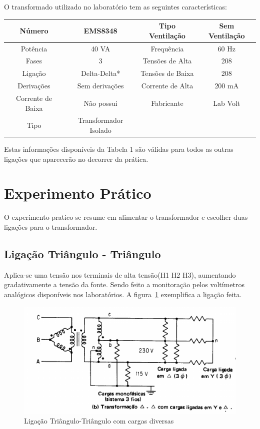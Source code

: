 \documentclass[paper=a4, fontsize=11pt]{article}
\begin{document}
O transformado utilizado no laboratório tem as seguintes características:

\renewcommand{\arraystretch}{1.5}
\begin{center}
    \begin{tabular}{c|c||c|c}
        Número & EMS8348  & Tipo Ventilação & Sem Ventilação\\
        \hline
        Potência & 40 VA & Frequência & 60 Hz\\
        \hline
        Fases  & 3 & Tensões de Alta & 208\\
        \hline
        Ligação & Delta-Delta* & Tensões de Baixa & 208\\
        \hline
        Derivações & Sem derivações & Corrente de Alta & 200 mA \\
        \hline
        Corrente de Baixa & Não possui & Fabricante & Lab Volt\\
        \hline
        Tipo & Transformador Isolado &&\\
    \end{tabular}
\end{center}

Estas informações disponíveis da Tabela 1 são válidas para todos as outras ligações
que aparecerão no decorrer da prática.

\section{Experimento Prático}

O experimento pratico se resume em alimentar o transformador e escolher duas ligações
para o transformador.

\subsection{Ligação Triângulo - Triângulo}

Aplica-se uma tensão nos terminais de alta tensão(H1 H2 H3), aumentando gradativamente
a tensão da fonte. Sendo feito a monitoração pelos voltímetros analógicos disponíveis
nos laboratórios. A figura~\ref{fig:figura1} exemplifica a ligação feita. 

\begin{figure}[!ht]
	\centering
	\includegraphics[scale=.8]{TT.png}
    \caption{Ligação Triângulo-Triângulo com cargas diversas}
    \label{fig:figura1}
\end{figure}
\end{document}
